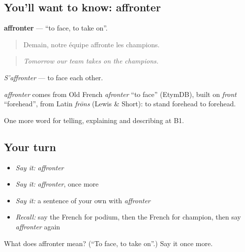 \subsection*{You'll want to know: affronter}
\textbf{affronter} — \textquotedblleft{}to face, to take on\textquotedblright{}.

\begin{quote}
Demain, notre équipe affronte les champions.
\end{quote}

\begin{quote}
\emph{Tomorrow our team takes on the champions.}
\end{quote}

\emph{S'affronter} — to face each other.

\begin{cousinweb}
\emph{affronter} comes from Old French \emph{afronter} \textquotedblleft{}to face\textquotedblright{} (EtymDB), built on \emph{front} \textquotedblleft{}forehead\textquotedblright{}, from Latin \emph{frōns} (Lewis \& Short): to stand forehead to forehead.
\end{cousinweb}

\begin{grammarlens}[title={What you've built}]
One more word for telling, explaining and describing at B1.
\end{grammarlens}

\subsection*{Your turn}
\begin{itemize}
\raggedright
  \item \emph{Say it:} \emph{affronter}
  \item \emph{Say it:} \emph{affronter}, once more
  \item \emph{Say it:} a sentence of your own with \emph{affronter}
  \item \emph{Recall:} say the French for podium, then the French for champion, then say \emph{affronter} again
\end{itemize}

\begin{tcolorbox}[breakable,colback=teal!4,colframe=teal!35!black,title={Before you move on}]
What does affronter mean? (\textquotedblleft{}To face, to take on\textquotedblright{}.) Say it once more.
\end{tcolorbox}
